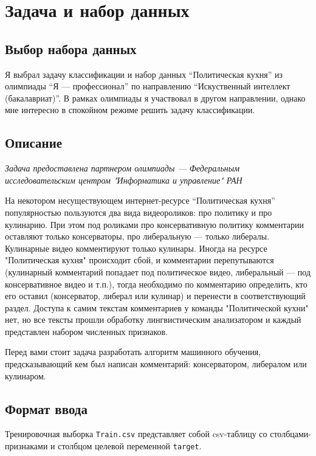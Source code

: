 \section{Задача и набор данных}
\subsection{Выбор набора данных}
Я выбрал задачу классификации и набор данных \enquote{Политическая кухня} \cite{dataset} из олимпиады \enquote{Я --- профессионал} по направлению \enquote{Искуственный интеллект (бакалавриат)}. В рамках олимпиады я участвовал в другом направлении, однако мне интересно в спокойном режиме решить задачу классификации.

\subsection{Описание}
\textit{Задача предоставлена партнером олимпиады --- Федеральным исследовательским центром "Информатика и управление" РАН}

На некотором несуществующем интернет-ресурсе \enquote{Политическая кухня} популярностью пользуются два вида видеороликов: про политику и про кулинарию. При этом под роликами про консервативную политику комментарии оставляют только консерваторы, про либеральную --- только либералы. Кулинарные видео комментируют только кулинары. Иногда на ресурсе "Политическая кухня" происходит сбой, и комментарии перепутываются (кулинарный комментарий попадает под политическое видео, либеральный --- под консервативное видео и т.п.), тогда необходимо по комментарию определить, кто его оставил (консерватор, либерал или кулинар) и перенести в соответствующий раздел. Доступа к самим текстам комментариев у команды "Политической кухни" нет, но все тексты прошли обработку лингвистическим анализатором и каждый представлен набором численных признаков.

Перед вами стоит задача разработать алгоритм машинного обучения, предсказывающий кем был написан комментарий: консерватором, либералом или кулинаром.
\pagebreak

\subsection{Формат ввода}
Тренировочная выборка \texttt{Train.csv} представляет собой csv-таблицу со столбцами-признаками и столбцом целевой переменной \texttt{target}.

